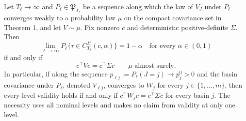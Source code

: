 Let \(T_\ell\to\infty\) and \(P_\ell\in\mathfrak P_{T_\ell}\) be a sequence along which the law of \(V_J\) under \(P_\ell\) converges weakly to a probability law \(\mu\) on the compact covariance set in Theorem 1, and let \(V\sim\mu\). Fix nonzero \(c\) and deterministic positive-definite \(\Sigma\). Then
\[
 \lim_{\ell\to\infty}P_\ell\{\tau\in C_{T_\ell}^{\Sigma}(c,\alpha)\}=1-\alpha
 \quad\text{for every }\alpha\in(0,1)
\]
if and only if
\[
 c^\top Vc=c^\top\Sigma c\qquad\mu\text{-almost surely}.
\]
In particular, if along the sequence \(p_{\ell j}:=P_\ell(J=j)\to p_j^0>0\) and the basin covariance under \(P_\ell\), denoted \(V_{\ell j}\), converges to \(W_j\) for every \(j\in\{1,\ldots,m\}\), then every-level validity holds if and only if \(c^\top W_jc=c^\top\Sigma c\) for every basin \(j\). The necessity uses all nominal levels and makes no claim from validity at only one level.